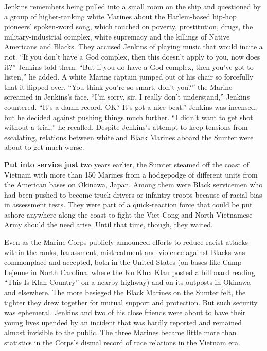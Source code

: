 Jenkins remembers being pulled into a small room on the ship and
questioned by a group of higher-ranking white Marines about the
Harlem-based hip-hop pioneers' spoken-word song, which touched on
poverty, prostitution, drugs, the military-industrial complex, white
supremacy and the killings of Native Americans and Blacks. They accused
Jenkins of playing music that would incite a riot. ``If you don't have a
God complex, then this doesn't apply to you, now does it?'' Jenkins told
them. ``But if you do have a God complex, then you've got to listen,''
he added. A white Marine captain jumped out of his chair so forcefully
that it flipped over. ``You think you're so smart, don't you?'' the
Marine screamed in Jenkins's face. ``I'm sorry, sir. I really don't
understand,'' Jenkins countered. ``It's a damn record, OK? It's got a
nice beat.'' Jenkins was incensed, but he decided against pushing things
much further. ``I didn't want to get shot without a trial,'' he
recalled. Despite Jenkins's attempt to keep tensions from escalating,
relations between white and Black Marines aboard the Sumter were about
to get much worse.

\textbf{Put into service just} two years earlier, the Sumter steamed off
the coast of Vietnam with more than 150 Marines from a hodgepodge of
different units from the American bases on Okinawa, Japan. Among them
were Black servicemen who had been pushed to become truck drivers or
infantry troops because of racial bias in assessment tests. They were
part of a quick-reaction force that could be put ashore anywhere along
the coast to fight the Viet Cong and North Vietnamese Army should the
need arise. Until that time, though, they waited.

Even as the Marine Corps publicly announced efforts to reduce racist
attacks within the ranks, harassment, mistreatment and violence against
Blacks was commonplace and accepted, both in the United States (on bases
like Camp Lejeune in North Carolina, where the Ku Klux Klan posted a
billboard reading ``This Is Klan Country'' on a nearby highway) and on
its outposts in Okinawa and elsewhere. The more besieged the Black
Marines on the Sumter felt, the tighter they drew together for mutual
support and protection. But such security was ephemeral. Jenkins and two
of his close friends were about to have their young lives upended by an
incident that was hardly reported and remained almost invisible to the
public. The three Marines became little more than statistics in the
Corps's dismal record of race relations in the Vietnam era.

